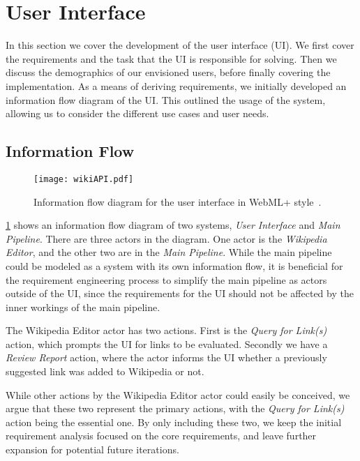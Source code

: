 \section{User Interface}\label{sec:design_ui}

In this section we cover the development of the user interface (UI). We first cover the requirements and the task that the UI is responsible for solving. Then we discuss the demographics of our envisioned users, before finally covering the implementation. As a means of deriving requirements, we initially developed an information flow diagram of the UI\@. This outlined the usage of the system, allowing us to consider the different use cases and user needs.

\subsection{Information Flow}

\begin{figure}[tbp]
\centering
\texttt{[image: wikiAPI.pdf]}
\caption[Information flow diagram for the user interface]{Information flow diagram for the user interface in WebML+ style~\cite{Casteleyn2009}.}
\label{fig:information_flow_UI}
\end{figure}

\cref{fig:information_flow_UI} shows an information flow diagram of two systems, \emph{User Interface} and \emph{Main Pipeline}. There are three actors in the diagram. One actor is the \emph{Wikipedia Editor}, and the other two are in the \emph{Main Pipeline}. While the main pipeline could be modeled as a system with its own information flow, it is beneficial for the requirement engineering process to simplify the main pipeline as actors outside of the UI, since the requirements for the UI should not be affected by the inner workings of the main pipeline.

The Wikipedia Editor actor has two actions. First is the \emph{Query for Link(s)} action, which prompts the UI for links to be evaluated. Secondly we have a \emph{Review Report} action, where the actor informs the UI whether a previously suggested link was added to Wikipedia or not.

While other actions by the Wikipedia Editor actor could easily be conceived, we argue that these two represent the primary actions, with the \emph{Query for Link(s)} action being the essential one. By only including these two, we keep the initial requirement analysis focused on the core requirements, and leave further expansion for potential future iterations.

